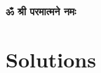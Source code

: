 \documentclass[12pt,twoside,openany]{book}
\begin{document}
\frontmatter
\maketitle
\thispagestyle{empty}
\vspace*{\fill}
\begin{LARGE}
\begin{center}
    \textbf{\textsanskrit{ॐ श्री परमात्मने नमः}}
\end{center}
\end{LARGE}
\vspace*{\fill}
\clearpage
{} \label{toc}
\tableofcontents


\mainmatter
\part{Solutions}



\backmatter

\end{document}
